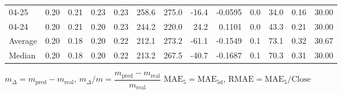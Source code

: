 \begin{threeparttable}
{\begin{tabular}{lrrrrrrrrrrrr}
  04-25 &          0.20 &          0.21 &          0.23 &        0.23 &               258.6 &               275.0 &      -16.4 &      -0.0595 &                 0.0 &             34.0 &            0.16 &                  30.00 \\
  04-24 &          0.20 &          0.21 &          0.20 &        0.23 &               244.2 &               220.0 &       24.2 &       0.1101 &                 0.0 &             43.3 &            0.21 &                  30.00 \\
Average &          0.20 &          0.18 &          0.20 &        0.22 &               212.1 &               273.2 &      -61.1 &      -0.1549 &                 0.1 &             73.1 &            0.32 &                  30.67 \\
 Median &          0.20 &          0.18 &          0.20 &        0.22 &               213.2 &               267.5 &      -40.7 &      -0.1687 &                 0.1 &             70.3 &            0.31 &                  30.00 \\
\bottomrule
\end{tabular}
}
\begin{tablenotes}\footnotesize
\item $m_\Delta=m_{\text{pred}}-m_{\text{real}}$,
$m_\Delta/m=\dfrac{m_{\text{pred}}-m_{\text{real}}}{m_{\text{real}}}$
$\mathrm{MAE}_5=\mathrm{MAE}_{5\text{d}}$,
$\mathrm{RMAE}=\mathrm{MAE}_5/\text{Close}$
\end{tablenotes}
\end{threeparttable}
\endgroup

